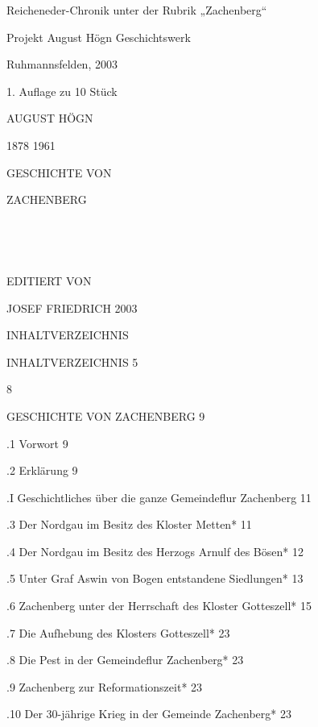 Reicheneder-Chronik unter der Rubrik „Zachenberg“



Projekt August Högn Geschichtswerk

Ruhmannsfelden, 2003

1. Auflage zu 10 Stück

AUGUST HÖGN

1878 1961





GESCHICHTE VON

ZACHENBERG































EDITIERT VON

JOSEF FRIEDRICH 2003



INHALTVERZEICHNIS

INHALTVERZEICHNIS   5

    8

GESCHICHTE VON ZACHENBERG   9

.1 Vorwort  9

.2 Erklärung    9

.I Geschichtliches über die ganze Gemeindeflur Zachenberg   11

.3 Der Nordgau im Besitz des Kloster Metten*    11

.4 Der Nordgau im Besitz des Herzogs Arnulf des Bösen*  12

.5 Unter Graf Aswin von Bogen entstandene Siedlungen*   13

.6 Zachenberg unter der Herrschaft des Kloster Gotteszell*  15

.7 Die Aufhebung des Klosters Gotteszell*   23

.8 Die Pest in der Gemeindeflur Zachenberg* 23

.9 Zachenberg zur Reformationszeit* 23

.10 Der 30-jährige Krieg in der Gemeinde Zachenberg*    23

